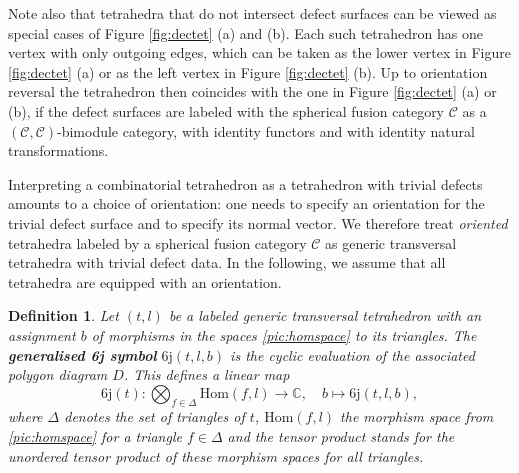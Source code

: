 \documentclass[1.5pt, a4paper]{article}
\newcommand{\C}{\mathbb{C}}
\newcommand{\mac}{\mathcal C}
\newcommand{\Hom}{\mathrm{Hom}}
\newtheorem{definition}[theorem]{Definition}
\begin{document}
Note also that  tetrahedra that do not intersect defect surfaces can be viewed as special cases of Figure \ref{fig:dectet} (a) and (b). 
Each such tetrahedron has one vertex with only outgoing  edges, which can be taken as the lower vertex in Figure \ref{fig:dectet} (a) or as the left vertex in Figure \ref{fig:dectet}  (b). 
Up to  orientation reversal  the tetrahedron then coincides with the one in  Figure \ref{fig:dectet} (a) or (b), if the defect surfaces  are labeled with the spherical fusion category $\mac$  as a $(\mac,\mac)$-bimodule category, with identity functors and with  identity natural transformations. 

Interpreting a combinatorial tetrahedron as a tetrahedron with trivial defects amounts to a choice of orientation: one needs to specify an orientation for the trivial defect surface and to specify its  normal vector. We therefore  treat \emph{oriented} tetrahedra labeled by a spherical fusion category $\mac$  as generic transversal tetrahedra with trivial defect data.  In the following, we assume that all tetrahedra are equipped with an orientation. 

\begin{definition}\label{def:gen6j}
Let $(t,l)$ be a labeled generic transversal tetrahedron  with an assignment $b$ of morphisms in the spaces \eqref{pic:homspace} to its triangles.
The {\bf generalised 6j symbol} $\mathrm{6j}(t,l,b)$  is the cyclic evaluation  of the associated polygon diagram $D$. This defines a linear map
$$
\mathrm{6j}(t): \bigotimes_{f\in\Delta} \Hom(f,l)\to \C, \quad b\mapsto \mathrm{6j}(t,l,b),
$$
where $\Delta$ denotes the set of triangles of $t$,  $\Hom(f,l)$ the  morphism space from \eqref{pic:homspace}  for a triangle $f\in \Delta$ and the tensor product stands for the unordered tensor product of these morphism spaces for all triangles.
\end{definition}
\end{document}
